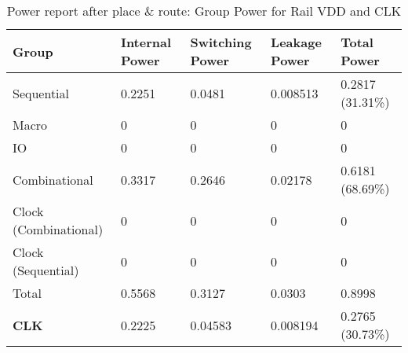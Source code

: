 \begin{table}
	\centering
\begin{tabular}{|l|l|l|l|l|}
	\hline
\textbf{Group}                &           \textbf{Internal  Power} &  \textbf{Switching  Power}  &   \textbf{Leakage  Power}     & \textbf{Total  Power} \\
\hline
Sequential       &                 0.2251  &    0.0481  &  0.008513   &   0.2817 (31.31\%) \\
Macro                       &           0    &       0       &    0      &     0  \\
IO                         &            0       &    0     &      0      &     0 \\
Combinational                &     0.3317   &   0.2646  &   0.02178    &  0.6181 (68.69\%) \\
Clock (Combinational)        &          0      &     0     &      0    &       0  \\
Clock (Sequential)             &        0     &      0      &     0     &      0 \\
\hline
Total                      &       0.5568   &   0.3127  &    0.0303    &  0.8998 \\\hline
\hline
\textbf{CLK}                         &      0.2225   &  0.04583  &  0.008194   &   0.2765 (30.73\%) \\\hline
\end{tabular}
\caption{Power report after place \& route: Group Power for Rail VDD and CLK}
\label{fig:innpwrvdd}
\end{table}